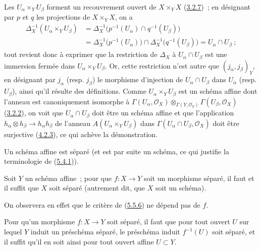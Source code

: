 Les $U_\alpha\times_Y U_\beta$ forment un recouvrement ouvert de
$X\times_Y X$ (\hyperref[I.3.2.7-fr]{3.2.7})~; en désignant par $p$ et $q$ les
projections de $X\times_Y X$, on a
\[
  \begin{aligned}
    \Delta_X^{-1}(U_\alpha\times_Y U_\beta)
      &=\Delta_X^{-1}\bigl(p^{-1}(U_\alpha)\cap q^{-1}(U_\beta)\bigr)\\
      &=\Delta_X^{-1}\bigl(p^{-1}(U_\alpha)\bigr)
        \cap\Delta_X^{-1}\bigl(q^{-1}(U_\beta)\bigr)
        =U_\alpha\cap U_\beta~;
  \end{aligned}
\]
tout revient donc à exprimer que la restriction de $\Delta_X$ à
$U_\alpha\cap U_\beta$ est une immersion fermée dans
$U_\alpha\times_Y U_\beta$. Or, cette restriction n'est autre que
$(j_\alpha,j_\beta)_Y$, en désignant par $j_\alpha$ (resp. $j_\beta$) le
morphisme d'injection de $U_\alpha\cap U_\beta$ dans $U_\alpha$ (resp.
$U_\beta$), ainsi qu'il résulte des définitions. Comme
$U_\alpha\times_Y U_\beta$ est un schéma affine dont l'anneau est
canoniquement isomorphe à
$\Gamma(U_\alpha,\mathscr{O}_X)
 \otimes_{\Gamma(Y,\mathscr{O}_Y)}
 \Gamma(U_\beta,\mathscr{O}_X)$
(\hyperref[I.3.2.2-fr]{3.2.2}), on voit que $U_\alpha\cap U_\beta$ doit être
un schéma affine et que l'application
$h_\alpha\otimes h_\beta\to h_\alpha h_\beta$ de l'anneau
$A(U_\alpha\times_Y U_\beta)$ dans
$\Gamma(U_\alpha\cap U_\beta,\mathscr{O}_X)$ doit être surjective
(\hyperref[I.4.2.3-fr]{4.2.3}), ce qui achève la démonstration.

\begin{corollary}[5.5.7]
\label{I.5.5.7-fr}
Un schéma affine est séparé (et est par suite un schéma, ce qui justifie la
terminologie de (\hyperref[I.5.4.1-fr]{5.4.1})).
\end{corollary}

\begin{corollary}[5.5.8]
\label{I.5.5.8-fr}
Soit $Y$ un schéma affine~; pour que $f:X\to Y$ soit un morphisme séparé, il
faut et il suffit que $X$ soit séparé (autrement dit, que $X$ soit un schéma).
\end{corollary}

On observera en effet que le critère de
(\hyperref[I.5.5.6-fr]{5.5.6}) ne dépend pas de $f$.

\begin{corollary}[5.5.9]
\label{I.5.5.9-fr}
Pour qu'un morphisme $f:X\to Y$ soit séparé, il faut que pour tout ouvert $U$
sur lequel $Y$ induit un préschéma séparé, le préschéma induit $f^{-1}(U)$
soit séparé, et il suffit qu'il en soit ainsi pour tout ouvert affine
$U\subset Y$.
\end{corollary}

